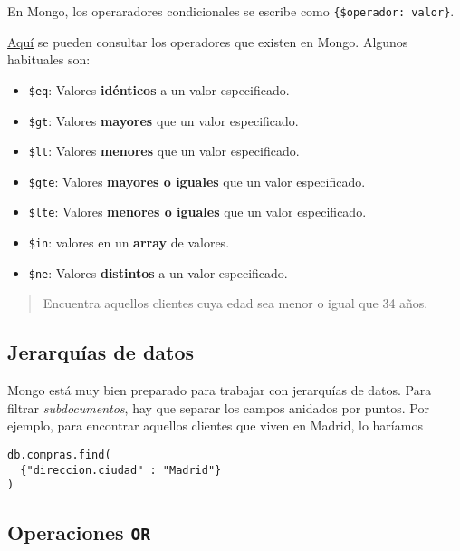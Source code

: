 \documentclass[]{article}
\providecommand{\tightlist}{%
  \setlength{\itemsep}{0pt}\setlength{\parskip}{0pt}}
\begin{document}
En Mongo, los operaradores condicionales se escribe como
\texttt{\{\$operador:\ valor\}}.

\href{https://docs.mongodb.com/manual/reference/operator/query/\#query-selectors}{Aquí}
se pueden consultar los operadores que existen en Mongo. Algunos
habituales son:

\begin{itemize}
\tightlist
\item
  \texttt{\$eq}: Valores \textbf{idénticos} a un valor especificado.
\item
  \texttt{\$gt}: Valores \textbf{mayores} que un valor especificado.
\item
  \texttt{\$lt}: Valores \textbf{menores} que un valor especificado.
\item
  \texttt{\$gte}: Valores \textbf{mayores o iguales} que un valor
  especificado.
\item
  \texttt{\$lte}: Valores \textbf{menores o iguales} que un valor
  especificado.
\item
  \texttt{\$in}: valores en un \textbf{array} de valores.
\item
  \texttt{\$ne}: Valores \textbf{distintos} a un valor especificado.
\end{itemize}

\begin{quote}
Encuentra aquellos clientes cuya edad sea menor o igual que 34 años.
\end{quote}

\hypertarget{jerarquias-de-datos}{%
\subsection{Jerarquías de datos}\label{jerarquias-de-datos}}

Mongo está muy bien preparado para trabajar con jerarquías de datos.
Para filtrar \emph{subdocumentos}, hay que separar los campos anidados
por puntos. Por ejemplo, para encontrar aquellos clientes que viven en
Madrid, lo haríamos

\begin{verbatim}
db.compras.find(
  {"direccion.ciudad" : "Madrid"}
)
\end{verbatim}

\hypertarget{operaciones-or}{%
\subsection{\texorpdfstring{Operaciones
\texttt{OR}}{Operaciones OR}}\label{operaciones-or}}
\end{document}
